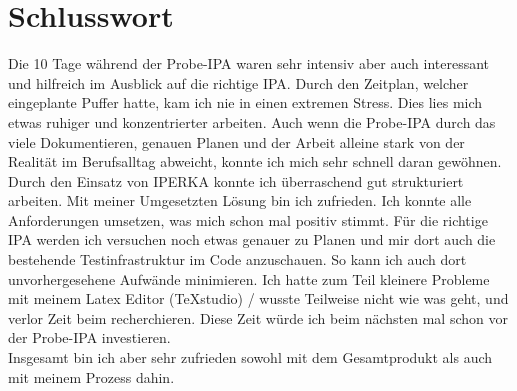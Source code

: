 \section{Schlusswort}
Die 10 Tage während der Probe-IPA waren sehr intensiv aber auch interessant und hilfreich im Ausblick auf die richtige IPA. Durch den Zeitplan, welcher eingeplante Puffer hatte, kam ich nie in einen extremen Stress. Dies lies mich etwas ruhiger und konzentrierter arbeiten. Auch wenn die Probe-IPA durch das viele Dokumentieren, genauen Planen und der Arbeit alleine stark von der Realität im Berufsalltag abweicht, konnte ich mich sehr schnell daran gewöhnen. Durch den Einsatz von IPERKA konnte ich überraschend gut strukturiert arbeiten. Mit meiner Umgesetzten Lösung bin ich zufrieden. Ich konnte alle Anforderungen umsetzen, was mich schon mal positiv stimmt. Für die richtige IPA werden ich versuchen noch etwas genauer zu Planen und mir dort auch die bestehende Testinfrastruktur im Code anzuschauen. So kann ich auch dort unvorhergesehene Aufwände minimieren. Ich hatte zum Teil kleinere Probleme mit meinem Latex Editor (TeXstudio) / wusste Teilweise nicht wie was geht, und verlor Zeit beim recherchieren. Diese Zeit würde ich beim nächsten mal schon vor der Probe-IPA investieren.\\
Insgesamt bin ich aber sehr zufrieden sowohl mit dem Gesamtprodukt als auch mit meinem Prozess dahin.


